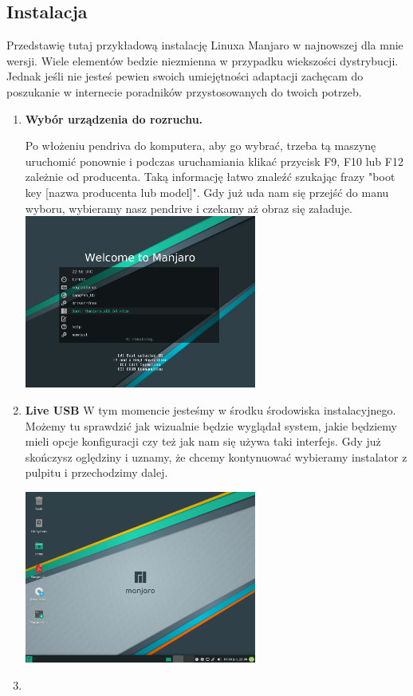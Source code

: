 \documentclass[10pt,a4paper]{report}
\begin{document}
		\subsection{Instalacja}
		
Przedstawię tutaj przykładową instalację Linuxa Manjaro w najnowszej dla mnie wersji. Wiele elementów bedzie niezmienna w przypadku wiekszości dystrybucji. Jednak jeśli nie jesteś pewien swoich umiejętności adaptacji zachęcam do poszukanie w internecie poradników przystosowanych do twoich potrzeb.

\begin{enumerate}
\item \textbf{Wybór urządzenia do rozruchu.}\par
Po włożeniu pendriva do komputera, aby go wybrać, trzeba tą maszynę uruchomić ponownie i podczas uruchamiania klikać przycisk F9, F10 lub F12 zależnie od producenta. Taką informację łatwo znaleźć szukając frazy "boot key [nazwa producenta lub model]". Gdy już uda nam się przejść do manu wyboru, wybieramy nasz pendrive i czekamy aż obraz się załaduje.\\

\includegraphics[width=0.6\textwidth, center]{manjaro_install1.png}

\item \textbf{Live USB}
W tym momencie jesteśmy w środku środowiska instalacyjnego. Możemy tu sprawdzić jak wizualnie będzie wyglądał system, jakie będziemy mieli opcje konfiguracji czy też jak nam się używa taki interfejs. Gdy już skończysz oględziny i uznamy, że chcemy kontynuować wybieramy instalator z pulpitu i przechodzimy dalej.

\includegraphics[width=0.6\textwidth, center]{manjaro_install2.png}

\item 
\end{enumerate}
 
\end{document}
